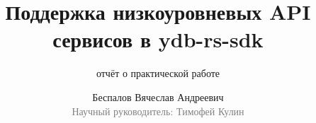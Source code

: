 \title[Поддержка низкоуровневых API сервисов]{Поддержка низкоуровневых API сервисов в ydb-rs-sdk}
\subtitle{отчёт о практической работе}
\author[Беспалов В.А.]{Беспалов Вячеслав Андреевич\\{\footnotesize\textcolor{gray}{Научный руководитель: Тимофей Кулин}}}
\frame{\titlepage}
